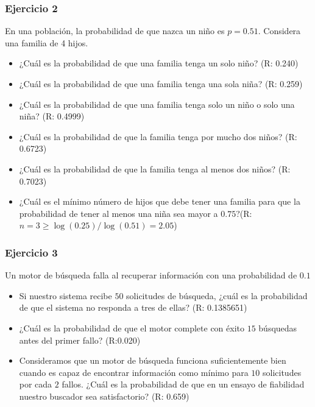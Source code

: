 \documentclass[
]{book}
\providecommand{\tightlist}{%
  \setlength{\itemsep}{0pt}\setlength{\parskip}{0pt}}
\begin{document}
\hypertarget{ejercicio-2-4}{%
\subsubsection{Ejercicio 2}\label{ejercicio-2-4}}

En una población, la probabilidad de que nazca un niño es \(p=0.51\). Considera una familia de 4 hijos.

\begin{itemize}
\tightlist
\item
  ¿Cuál es la probabilidad de que una familia tenga un solo niño? (R: 0.240)
\item
  ¿Cuál es la probabilidad de que una familia tenga una sola niña? (R: 0.259)
\item
  ¿Cuál es la probabilidad de que una familia tenga solo un niño o solo una niña? (R: 0.4999)
\item
  ¿Cuál es la probabilidad de que la familia tenga por mucho dos niños? (R: 0.6723)
\item
  ¿Cuál es la probabilidad de que la familia tenga al menos dos niños? (R: 0.7023)
\item
  ¿Cuál es el mínimo número de hijos que debe tener una familia para que la probabilidad de tener al menos una niña sea mayor a \(0.75\)?(R:\(n=3 \geq\log(0.25)/\log(0.51)=2.05\))
\end{itemize}

\hypertarget{ejercicio-3-4}{%
\subsubsection{Ejercicio 3}\label{ejercicio-3-4}}

Un motor de búsqueda falla al recuperar información con una probabilidad de \(0.1\)

\begin{itemize}
\item
  Si nuestro sistema recibe \(50\) solicitudes de búsqueda, ¿cuál es la probabilidad de que el sistema no responda a tres de ellas? (R: 0.1385651)
\item
  ¿Cuál es la probabilidad de que el motor complete con éxito \(15\) búsquedas antes del primer fallo? (R:0.020)
\item
  Consideramos que un motor de búsqueda funciona suficientemente bien cuando es capaz de encontrar información como mínimo para \(10\) solicitudes por cada \(2\) fallos. ¿Cuál es la probabilidad de que en un ensayo de fiabilidad nuestro buscador sea satisfactorio? (R: 0.659)
\end{itemize}
\end{document}
